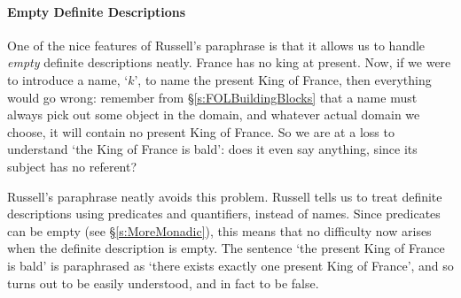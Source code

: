 \paragraph{Empty Definite Descriptions}
One of the nice features of Russell's paraphrase is that it allows us to handle \emph{empty} definite descriptions neatly. France has no king at present. Now, if we were to introduce a name, `$k$', to name the present King of France, then everything would go wrong: remember from §\ref{s:FOLBuildingBlocks} that a name must always pick out some object in the domain, and whatever actual domain we choose, it will contain no present King of France. So we are at a loss to understand `the King of France is bald': does it even say anything, since its subject has no referent?

Russell's paraphrase neatly avoids this problem. Russell tells us to treat definite descriptions using predicates and quantifiers, instead of names. Since predicates can be empty (see §\ref{s:MoreMonadic}), this means that no difficulty now arises when the definite description is empty. The sentence `the present King of France is bald' is paraphrased as `there exists exactly one present King of France', and so turns out to be easily understood, and in fact to be false.

